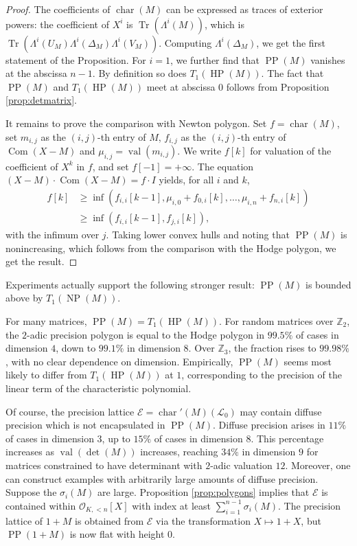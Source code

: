 \documentclass{sig-alternate}
\DeclareMathOperator{\NP}{NP}
\DeclareMathOperator{\HP}{HP}
\DeclareMathOperator{\PP}{PP}
\DeclareMathOperator{\val}{val}
\DeclareMathOperator{\tr}{Tr}
\DeclareMathOperator{\com}{Com}
\newcommand{\Z}{\mathbb Z}
\renewcommand{\O}{\mathcal O}
\DeclareMathOperator{\charpoly}{char}
\newcommand{\charp}{\charpoly'}
\begin{document}
\begin{proof}
The coefficients of $\charpoly(M)$ can be expressed as traces of 
exterior powers: the coefficient of $X^i$ is $\tr(\Lambda^i(M))$,
which is $\tr(\Lambda^i(U_M) \Lambda^i(\Delta_M) \Lambda^i(V_M))$.  
Computing $\Lambda^i(\Delta_M)$, we get the first statement of
the Proposition. For $i = 1$, we further find that $\PP(M)$ vanishes
at the abscissa $n{-}1$. By definition so does $T_1(\HP(M))$. The fact 
that $\PP(M)$ and $T_1(\HP(M))$ meet at abscissa $0$ follows from
Proposition \ref{prop:detmatrix}.

It remains to prove the comparison with Newton polygon.
Set $f = \charpoly(M)$, set $m_{i,j}$ as the $(i,j)$-th entry of $M$, 
$f_{i,j}$ as the $(i,j)$-th entry of $\com(X{-}M)$ and $\mu_{i,j} = 
\val(m_{i,j})$. We write $f[k]$ 
for valuation of the coefficient of $X^k$ in $f$, and set $f[-1] = 
+\infty$. The equation $(X{-}M) \cdot \com(X{-}M) = f \cdot I$ yields, 
for all $i$ and $k$,
\begin{align*}
f[k] &\ge \inf(f_{i,i}[k{-}1], \mu_{i,0} + f_{0,i}[k], \ldots, 
\mu_{i,n} + f_{n,i}[k]) \\
&\ge \inf(f_{i,i}[k{-}1], f_{j,i}[k]),
\end{align*}
with the infimum over $j$. 
Taking lower convex hulls and noting that $\PP(M)$ is nonincreasing,
which follows from the comparison with the Hodge polygon, we get the 
result.
\end{proof}

\begin{rem}
Experiments actually support the following stronger result: $\PP(M)$ is 
bounded above by $T_1(\NP(M))$.
\end{rem}

For many matrices, $\PP(M) = T_1(\HP(M))$.  For random matrices over 
$\Z_2$, the $2$-adic precision polygon is equal to the Hodge polygon in 
$99.5\%$ of cases in dimension $4$, down to $99.1\%$ in dimension $8$.  
Over $\Z_3$, the fraction rises to $99.98\%$, with no clear dependence on 
dimension.
Empirically, $\PP(M)$ seems most likely to differ from $T_1(\HP(M))$ at 
$1$, corresponding to the precision of the linear term of the 
characteristic polynomial.

Of course, the precision lattice $\mathcal{E} = \charp(M)(\mathcal L_0)$ 
may contain diffuse precision which is not encapsulated in $\PP(M)$.
Diffuse precision arises in $11\%$ of cases in 
dimension $3$, up to $15\%$ of cases in dimension $8$.  This 
percentage increases as $\val(\det(M))$ increases, reaching $34\%$ in 
dimension $9$ for matrices constrained to have determinant with $2$-adic 
valuation $12$.
Moreover, one can construct examples with arbitrarily large amounts of diffuse precision.
Suppose the $\sigma_i(M)$ are large.  
Proposition \ref{prop:polygons} implies that $\mathcal{E}$ is 
contained within $\O_{K, <n}[X]$ with index at least $\sum_{i=1}^{n-1} 
\sigma_i(M)$.  The precision lattice of $1 + M$ is obtained from 
$\mathcal{E}$ via the transformation $X \mapsto 1 + X$, but $\PP(1 + M)$ 
is now flat with height $0$.
\end{document}
